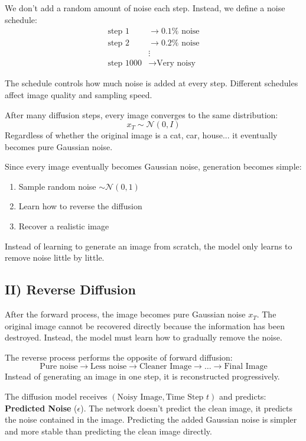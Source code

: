 We don't add a random amount of noise each step. Instead, we define a noise schedule:
\begin{align*}
\text{step 1} &\longrightarrow 0.1\% \text{ noise} \\
\text{step 2} &\longrightarrow 0.2\% \text{ noise} \\
&\vdots \\
\text{step 1000} &\longrightarrow \text{Very noisy}
\end{align*}

The schedule controls how much noise is added at every step. Different schedules affect image quality and sampling speed.

After many diffusion steps, every image converges to the same distribution:
\[
x_T \sim \mathcal{N}(0, I)
\]
Regardless of whether the original image is a cat, car, house... it eventually becomes pure Gaussian noise.

Since every image eventually becomes Gaussian noise, generation becomes simple:
\begin{enumerate}
    \item Sample random noise $\sim \mathcal{N}(0, 1)$
    \item Learn how to reverse the diffusion
    \item Recover a realistic image
\end{enumerate}
Instead of learning to generate an image from scratch, the model only learns to remove noise little by little.

\subsection*{II) Reverse Diffusion}

After the forward process, the image becomes pure Gaussian noise $x_T$. The original image cannot be recovered directly because the information has been destroyed. Instead, the model must learn how to gradually remove the noise.

The reverse process performs the opposite of forward diffusion:
\[
\text{Pure noise} \longrightarrow \text{Less noise} \longrightarrow \text{Cleaner Image} \longrightarrow \dots \longrightarrow \text{Final Image}
\]
Instead of generating an image in one step, it is reconstructed progressively.

The diffusion model receives $(\text{Noisy Image}, \text{Time Step } t)$ and predicts: \textbf{Predicted Noise} ($\epsilon$). The network doesn't predict the clean image, it predicts the noise contained in the image.
Predicting the added Gaussian noise is simpler and more stable than predicting the clean image directly.

